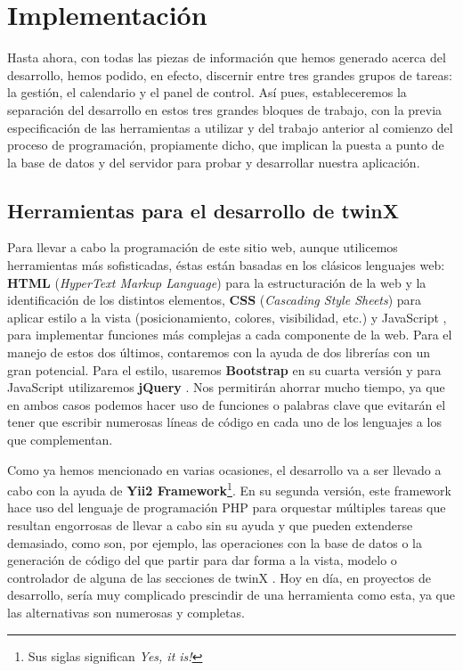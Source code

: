 \chapter{Implementación}
\label{implementacion}

Hasta ahora, con todas las piezas de información que hemos generado acerca del desarrollo, hemos podido, en efecto, discernir entre tres grandes grupos de tareas: la gestión, el calendario y el panel de control. Así pues, estableceremos la separación del desarrollo en estos tres grandes bloques de trabajo, con la previa especificación de las herramientas a utilizar y del trabajo anterior al comienzo del proceso de programación, propiamente dicho, que implican la puesta a punto de la base de datos y del servidor para probar y desarrollar nuestra aplicación.

\section{Herramientas para el desarrollo de twinX}

Para llevar a cabo la programación de este sitio web, aunque utilicemos herramientas más sofisticadas, éstas están basadas en los clásicos lenguajes web: \textbf{HTML} (\textit{HyperText Markup Language}) \cite{html} para la estructuración de la web y la identificación de los distintos elementos, \textbf{CSS} \cite{css} (\textit{Cascading Style Sheets}) para aplicar estilo a la vista (posicionamiento, colores, visibilidad, etc.) y JavaScript \cite{javascript}, para implementar funciones más complejas a cada componente de la web. Para el manejo de estos dos últimos, contaremos con la ayuda de dos librerías con un gran potencial. Para el estilo, usaremos \textbf{Bootstrap} \cite{bootstrap} en su cuarta versión y para JavaScript utilizaremos \textbf{jQuery} \cite{jquery}. Nos permitirán ahorrar mucho tiempo, ya que en ambos casos podemos hacer uso de funciones o palabras clave que evitarán el tener que escribir numerosas líneas de código en cada uno de los lenguajes a los que complementan.

Como ya hemos mencionado en varias ocasiones, el desarrollo va a ser llevado a cabo con la ayuda de \textbf{Yii2 Framework}\footnote{Sus siglas significan \textit{Yes, it is!}}. En su segunda versión, este framework hace uso del lenguaje de programación PHP para orquestar múltiples tareas que resultan engorrosas de llevar a cabo sin su ayuda y que pueden extenderse demasiado, como son, por ejemplo, las operaciones con la base de datos o la generación de código del que partir para dar forma a la vista, modelo o controlador de alguna de las secciones de twinX \cite{yii}. Hoy en día, en proyectos de desarrollo, sería muy complicado prescindir de una herramienta como esta, ya que las alternativas son numerosas y completas.

